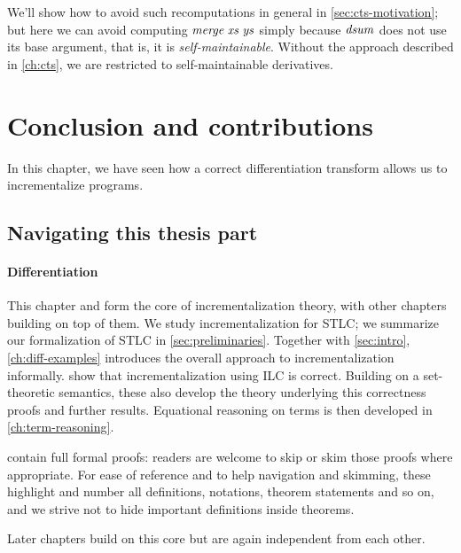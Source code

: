 We'll show how to avoid such recomputations in general in
\cref{sec:cts-motivation}; but here we can avoid computing \ensuremath{\Varid{merge}\;\Varid{xs}\;\Varid{ys}} simply
because \ensuremath{\Varid{dsum}} does not use its base argument, that is, it is
\emph{self-maintainable}. Without the approach described in
\cref{ch:cts}, we are restricted to self-maintainable derivatives.

\section{Conclusion and contributions}
\label{sec:incr-contributions}
In this chapter, we have seen how a correct differentiation transform
allows us to incrementalize programs.

\subsection{Navigating this thesis part}
\label{sec:navigating-incr}

\paragraph{Differentiation}
This chapter and  form the core
of incrementalization theory, with other chapters building on top of them.
We study incrementalization for STLC; we summarize our formalization of STLC in
\cref{sec:preliminaries}.
Together with \cref{sec:intro}, \cref{ch:diff-examples} introduces the overall
approach to incrementalization informally.
 show that incrementalization using
ILC is correct.
Building on a set-theoretic semantics, these
 also develop the theory
underlying this correctness proofs and further results.
Equational reasoning on terms is then developed
in \cref{ch:term-reasoning}.

 contain full
formal proofs: readers are welcome to skip or skim those proofs where
appropriate.
For ease of reference and to help navigation and skimming, these highlight and
number all definitions, notations, theorem statements and so on, and we strive
not to hide important definitions inside theorems.

Later chapters build on this core but are again independent from each other.

